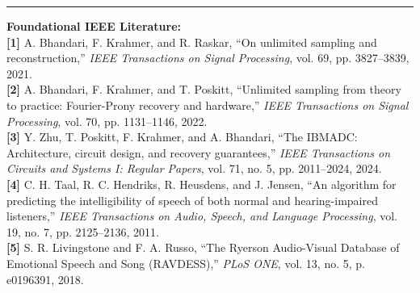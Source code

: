 \documentclass[aspectratio=169,11pt]{beamer}
\begin{document}
\begin{frame}[t]
  \vspace*{-0.20cm}

  \begin{glasscard}[top=3pt, bottom=3pt, left=7pt, right=7pt]
    {\color{accentLightBlue}\rule[-1pt]{2.5pt}{8pt}}\hspace{5pt}%
    {\fontsize{9pt}{11pt}\selectfont\bfseries\color{textPrimary} Foundational IEEE Literature:}\\[3pt]
    {\fontsize{7.6pt}{9.8pt}\selectfont\color{black!75}
    \textbf{[1]} A. Bhandari, F. Krahmer, and R. Raskar, ``On unlimited sampling and reconstruction,'' \textit{IEEE Transactions on Signal Processing}, vol. 69, pp. 3827--3839, 2021.\\[2pt]
    \textbf{[2]} A. Bhandari, F. Krahmer, and T. Poskitt, ``Unlimited sampling from theory to practice: Fourier-Prony recovery and hardware,'' \textit{IEEE Transactions on Signal Processing}, vol. 70, pp. 1131--1146, 2022.\\[2pt]
    \textbf{[3]} Y. Zhu, T. Poskitt, F. Krahmer, and A. Bhandari, ``The IBMADC: Architecture, circuit design, and recovery guarantees,'' \textit{IEEE Transactions on Circuits and Systems I: Regular Papers}, vol. 71, no. 5, pp. 2011--2024, 2024.\\[2pt]
    \textbf{[4]} C. H. Taal, R. C. Hendriks, R. Heusdens, and J. Jensen, ``An algorithm for predicting the intelligibility of speech of both normal and hearing-impaired listeners,'' \textit{IEEE Transactions on Audio, Speech, and Language Processing}, vol. 19, no. 7, pp. 2125--2136, 2011.\\[2pt]
    \textbf{[5]} S. R. Livingstone and F. A. Russo, ``The Ryerson Audio-Visual Database of Emotional Speech and Song (RAVDESS),'' \textit{PLoS ONE}, vol. 13, no. 5, p. e0196391, 2018.
    }
  \end{glasscard}
\end{frame}
\end{document}
